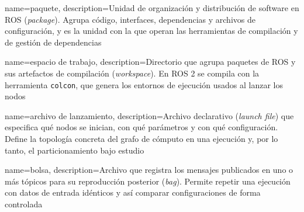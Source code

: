 {
    name={paquete},
    description={Unidad de organización y distribución de software en ROS
    (\emph{package}). Agrupa código, interfaces, dependencias y archivos de
    configuración, y es la unidad con la que operan las herramientas de
    compilación y de gestión de dependencias}
}

{
    name={espacio de trabajo},
    description={Directorio que agrupa paquetes de ROS y sus artefactos de
    compilación (\emph{workspace}). En ROS 2 se compila con la herramienta
    \texttt{colcon}, que genera los entornos de ejecución usados al lanzar los
    nodos}
}

{
    name={archivo de lanzamiento},
    description={Archivo declarativo (\emph{launch file}) que especifica qué
    nodos se inician, con qué parámetros y con qué configuración. Define la
    topología concreta del grafo de cómputo en una ejecución y, por lo tanto,
    el particionamiento bajo estudio}
}

{
    name={bolsa},
    description={Archivo que registra los mensajes publicados en uno o más
    tópicos para su reproducción posterior (\emph{bag}). Permite repetir una
    ejecución con datos de entrada idénticos y así comparar configuraciones de
    forma controlada}
}
